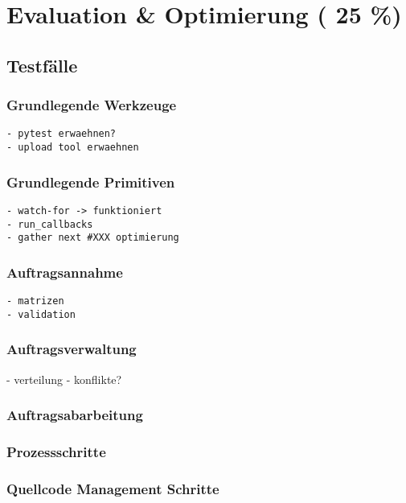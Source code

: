 \chapter{Evaluation \& Optimierung ( 25 \%)}

\section{Testfälle}
\subsection{Grundlegende Werkzeuge}

\begin{verbatim}
- pytest erwaehnen?
- upload tool erwaehnen
\end{verbatim}

\subsection{Grundlegende Primitiven}

\begin{verbatim}
- watch-for -> funktioniert
- run_callbacks
- gather next #XXX optimierung
\end{verbatim}

\subsection{Auftragsannahme}
\begin{verbatim}
- matrizen
- validation
\end{verbatim}

\subsection{Auftragsverwaltung}
- verteilung
- konflikte?

\subsection{Auftragsabarbeitung}

\subsection{Prozessschritte}
\subsection{Quellcode Management Schritte}

